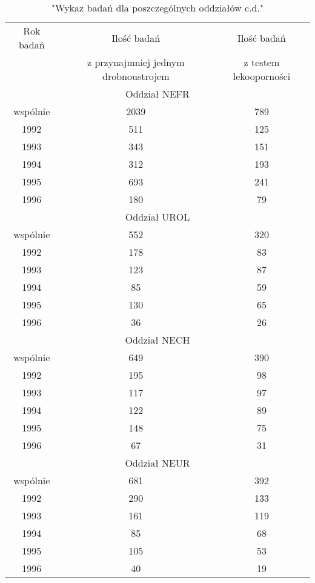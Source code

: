 \documentclass[a4paper,11pt]{article}
\begin{document}
\begin{table}[h]
\begin{center}
\caption{"Wykaz badań dla poszczególnych oddziałów c.d."}
\begin{tabular}{c|c|c}
\hline
Rok badań & Ilość badań & Ilość badań \\
& z przynajmniej jednym drobnoustrojem &z testem lekooporności \\

\hline \multicolumn{3}{|c|}{Oddział NEFR} \\ \hline
wspólnie &2039 &789 \\
1992 &511 &125 \\
1993 &343 &151 \\
1994 &312 &193 \\
1995 &693 &241 \\
1996 &180 &79 \\
\hline \multicolumn{3}{|c|}{Oddział UROL} \\ \hline
wspólnie &552 &320 \\
1992 &178 &83 \\
1993 &123 &87 \\
1994 &85 &59 \\
1995 &130 &65 \\
1996 &36 &26 \\
\hline \multicolumn{3}{|c|}{Oddział NECH} \\ \hline
wspólnie &649 &390 \\
1992 &195 &98 \\
1993 &117 &97 \\
1994 &122 &89 \\
1995 &148 &75 \\
1996 &67 &31 \\
\hline \multicolumn{3}{|c|}{Oddział NEUR} \\ \hline
wspólnie &681 &392 \\
1992 &290 &133 \\
1993 &161 &119 \\
1994 &85 &68 \\
1995 &105 &53 \\
1996 &40 &19 \\


\end{tabular}
\end{center}
\end{table}
\end{document}

